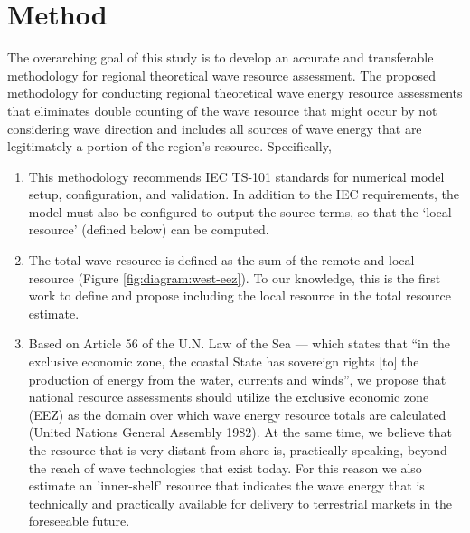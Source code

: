 \section{Method} \label{sec:method}

The overarching goal of this study is to develop an accurate and transferable methodology for regional theoretical wave resource assessment. The proposed methodology for conducting regional theoretical wave energy resource assessments that eliminates double counting of the wave resource that might occur by not considering wave direction and includes all sources of wave energy that are legitimately a portion of the region's resource. Specifically,

\begin{enumerate}
    \item This methodology recommends IEC TS-101 standards for numerical model setup, configuration, and validation. In addition to the IEC requirements, the model must also be configured to output the source terms, so that the `local resource' (defined below) can be computed.
    
    \item The total wave resource is defined as the sum of the remote and local resource (Figure \ref{fig:diagram:west-eez}). To our knowledge, this is the first work to define and propose including the local resource in the total resource estimate. 

    \item Based on Article 56 of the U.N. Law of the Sea — which states that ``in the exclusive economic zone, the coastal State has sovereign rights [to] the production of energy from the water, currents and winds'', we propose that national resource assessments should utilize the exclusive economic zone (EEZ) as the domain over which wave energy resource totals are calculated (United Nations General Assembly 1982). At the same time, we believe that the resource that is very distant from shore is, practically speaking, beyond the reach of wave technologies that exist today. For this reason we also estimate an 'inner-shelf' resource that indicates the wave energy that is technically and practically available for delivery to terrestrial markets in the foreseeable future.
    
\end{enumerate}

